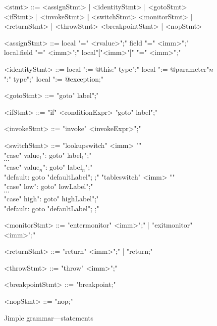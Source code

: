 \begin{figure}
\grammarindent=110pt
\centering
\begin{grammar}
<stmt> ::= <assignStmt> | <identityStmt> | <gotoStmt>
    \alt <ifStmt> | <invokeStmt> | <switchStmt>
    \alt <monitorStmt> | <returnStmt> | <throwStmt> 
    \alt <breakpointStmt> | <nopStmt>

<assignStmt> ::= local "=" <rvalue>";"
    \alt field "=" <imm>";"
    \alt local.field "=" <imm>";"
    \alt local"["<imm>"]" "=" <imm>";"

<identityStmt> ::= local ":= @this:" type";"
    \alt local ":= @parameter"$n$":" type";"
    \alt local ":= @exception;"
    
<gotoStmt> ::= "goto" label";"

<ifStmt> ::= "if" <conditionExpr> "goto" label";"

<invokeStmt> ::= "invoke" <invokeExpr>";"

<switchStmt> ::= "lookupswitch" <imm> "{" \\
    "case" value$_1$": goto" label$_1$";" \\
    $\cdots$ \\
    "case" value$_n$": goto" label$_n$";" \\
    "default: goto "defaultLabel"; };"
    \alt "tableswitch" <imm> "{" \\
    "case" low": goto" lowLabel";" \\
    $\cdots$ \\
    "case" high": goto" highLabel";" \\
    "default: goto "defaultLabel"; };"

<monitorStmt> ::= "entermonitor" <imm>";" | "exitmonitor" <imm>";"

<returnStmt> ::= "return" <imm>";" | "return;"

<throwStmt> ::= "throw" <imm>";"

<breakpointStmt> ::= "breakpoint;"

<nopStmt> ::= "nop;"
\end{grammar}
\label{fig:grmJimpleStmt}
\caption{Jimple grammar---statements}
\end{figure}
